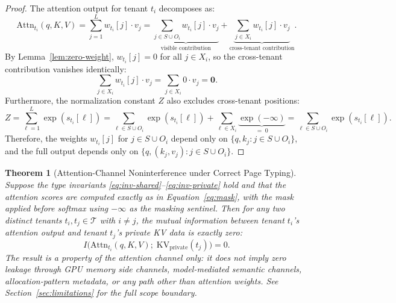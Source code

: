 \documentclass[11pt]{article}
\newtheorem{theorem}{Theorem}
\begin{document}
\begin{proof}
The attention output for tenant $t_i$ decomposes as:
\begin{equation}
    \mathrm{Attn}_{t_i}(q, K, V) = \sum_{j=1}^{L} w_{t_i}[j] \cdot v_j
    = \underbrace{\sum_{j \in S \cup O_i} w_{t_i}[j] \cdot v_j}_{\text{visible contribution}}
    + \underbrace{\sum_{j \in X_i} w_{t_i}[j] \cdot v_j}_{\text{cross-tenant contribution}}.
\end{equation}
By Lemma~\ref{lem:zero-weight}, $w_{t_i}[j] = 0$ for all $j \in X_i$, so the
cross-tenant contribution vanishes identically:
\begin{equation}
    \sum_{j \in X_i} w_{t_i}[j] \cdot v_j = \sum_{j \in X_i} 0 \cdot v_j = \mathbf{0}.
\end{equation}
Furthermore, the normalization constant $Z$ also excludes cross-tenant positions:
\begin{equation}
    Z = \sum_{\ell=1}^{L} \exp(s_{t_i}[\ell])
      = \sum_{\ell \in S \cup O_i} \exp(s_{t_i}[\ell])
      + \sum_{\ell \in X_i} \underbrace{\exp(-\infty)}_{=\;0} = \sum_{\ell \in S \cup O_i} \exp(s_{t_i}[\ell]).
\end{equation}
Therefore, the weights $w_{t_i}[j]$ for $j \in S \cup O_i$ depend only on
$\{q, k_j : j \in S \cup O_i\}$, and the full output depends only on
$\{q, (k_j, v_j) : j \in S \cup O_i\}$.
\end{proof}

\begin{theorem}[Attention-Channel Noninterference under Correct Page Typing]
\label{thm:isolation}
Suppose the type invariants \eqref{eq:inv-shared}--\eqref{eq:inv-private}
hold and that the attention scores are computed exactly as in
Equation~\eqref{eq:mask}, with the mask applied before softmax using
$-\infty$ as the masking sentinel.
Then for any two distinct tenants $t_i, t_j \in \mathcal{T}$ with $i \neq j$,
the mutual information between tenant $t_i$'s attention output and tenant
$t_j$'s private KV data is exactly zero:
\begin{equation}
    I\!\big(\mathrm{Attn}_{t_i}(q, K, V);\; \mathrm{KV}_{\mathrm{private}}(t_j)\big) = 0.
\end{equation}
The result is a property of the \emph{attention channel} only: it does not
imply zero leakage through GPU memory side channels, model-mediated
semantic channels, allocation-pattern metadata, or any path other than
attention weights.  See Section~\ref{sec:limitations} for the full scope
boundary.
\end{theorem}
\end{document}
